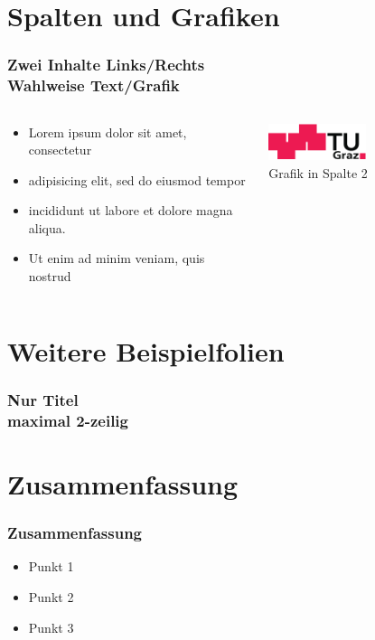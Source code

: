 \section{Spalten und Grafiken}
\begin{frame}
	\frametitle{Zwei Inhalte Links/Rechts\\Wahlweise Text/Grafik}
	\begin{columns}[onlytextwidth]
		\begin{column}{0.5\textwidth}
			\begin{itemize}
				\item Lorem ipsum dolor sit amet, consectetur 
				\item adipisicing elit, sed do eiusmod tempor 
				\item incididunt ut labore et dolore magna aliqua. 
				\item Ut enim ad minim veniam, quis nostrud 
			\end{itemize}
		\end{column}
		\begin{column}{0.5\textwidth}
			\begin{center}
			\includegraphics[width=0.5\textwidth]{logo.pdf}\\
			Grafik in Spalte 2
			\end{center}
		\end{column}
	\end{columns}
\end{frame}

\section{Weitere Beispielfolien}

\begin{frame}
	\frametitle{Nur Titel \\maximal 2-zeilig}
\end{frame}


\section{Zusammenfassung}

\begin{frame}
	\frametitle{Zusammenfassung}
	\begin{itemize}
		\item Punkt 1
		\item Punkt 2
		\item Punkt 3
	\end{itemize}
\end{frame}


